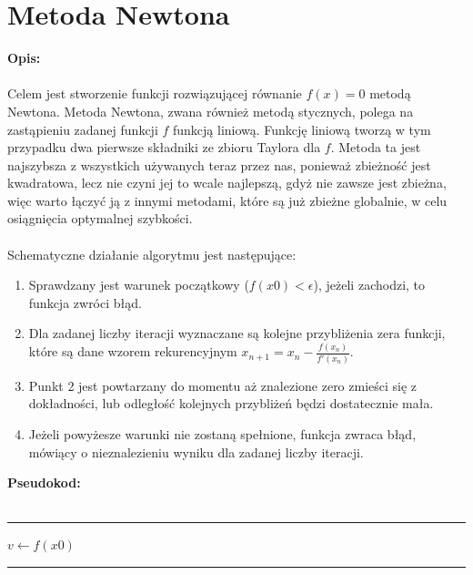 \documentclass{article}
\begin{document}
\section*{Metoda Newtona}
\noindent \textbf{Opis: }\\\\
Celem jest stworzenie funkcji rozwiązującej równanie $f(x)=0$ metodą Newtona. Metoda Newtona, zwana również metodą stycznych, polega na zastąpieniu zadanej funkcji $f$ funkcją liniową. Funkcję liniową tworzą w tym przypadku dwa pierwsze składniki ze zbioru Taylora dla $f$. Metoda ta jest najszybsza z wszystkich używanych teraz przez nas, ponieważ zbieżność jest kwadratowa, lecz nie czyni jej to wcale najlepszą, gdyż nie zawsze jest zbieżna, więc warto łączyć ją z innymi metodami, które są już zbieżne globalnie, w celu osiągnięcia optymalnej szybkości.\\\\
Schematyczne działanie algorytmu jest następujące: 
\begin{enumerate}
	\item Sprawdzany jest warunek początkowy ($f(x0) < \epsilon$), jeżeli zachodzi, to funkcja zwróci błąd.
	\item Dla zadanej liczby iteracji wyznaczane są kolejne przybliżenia zera funkcji, które są dane wzorem rekurencyjnym $x_{n+1} = x_{n} - \frac{f(x_{n})}{f'(x_{n})}$.
	\item Punkt 2 jest powtarzany do momentu aż znalezione zero zmieści się z dokładności, lub odległość kolejnych przybliżeń będzi dostatecznie mała.
	\item Jeżeli powyżesze warunki nie zostaną spełnione, funkcja zwraca błąd, mówiący o nieznalezieniu wyniku dla zadanej liczby iteracji.
\end{enumerate}
\noindent \textbf{Pseudokod: }\\\\ 
\rule{\textwidth}{0.4pt}
\begin{algorithm}[H]
	\vspace{0.3cm}
	$v \leftarrow f(x0)$\;
	{}
\end{algorithm}
\hrule
\end{document}
